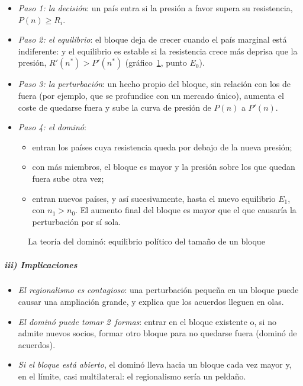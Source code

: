 \documentclass[11pt]{article}
\begin{document}
\begin{itemize}
\item \emph{Paso 1: la decisión}: un país entra si la presión a favor supera su resistencia, $P(n)\geq R_i$.
\item \emph{Paso 2: el equilibrio}: el bloque deja de crecer cuando el país marginal está indiferente:
  y el equilibrio es estable si la resistencia crece más deprisa que la presión, $R'(n^*)>P'(n^*)$ (gráfico~\ref{fig:domino}, punto $E_0$).
\item \emph{Paso 3: la perturbación}: un hecho propio del bloque, sin relación con los de fuera (por ejemplo, que se profundice con un mercado único), aumenta el coste de quedarse fuera y sube la curva de presión de $P(n)$ a $P'(n)$.
\item \emph{Paso 4: el dominó}:
  \begin{itemize}
  \item entran los países cuya resistencia queda por debajo de la nueva presión;
  \item con más miembros, el bloque es mayor y la presión sobre los que quedan fuera sube otra vez;
  \item entran nuevos países, y así sucesivamente, hasta el nuevo equilibrio $E_1$, con $n_1>n_0$. El aumento final del bloque es mayor que el que causaría la perturbación por sí sola.
  \end{itemize}
\end{itemize}

\begin{figure}[H]
\centering
\caption{La teoría del dominó: equilibrio político del tamaño de un bloque}\label{fig:domino}
\end{figure}

\subparagraph{iii) Implicaciones}

\begin{itemize}
\item \emph{El regionalismo es contagioso}: una perturbación pequeña en un bloque puede causar una ampliación grande, y explica que los acuerdos lleguen en olas.
\item \emph{El dominó puede tomar 2~formas}: entrar en el bloque existente o, si no admite nuevos socios, formar otro bloque para no quedarse fuera (dominó de acuerdos).
\item \emph{Si el bloque está abierto}, el dominó lleva hacia un bloque cada vez mayor y, en el límite, casi multilateral: el regionalismo sería un peldaño.
\end{itemize}
\end{document}
